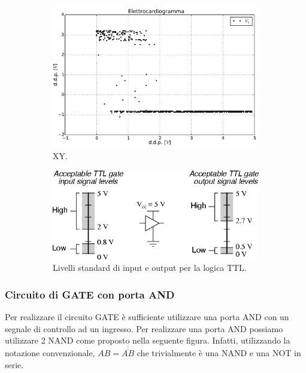 \begin{figure}[htpc]
\centering
	\begin{subfigure}[hc]{0.49\textwidth}
		\centering
		\includegraphics[width=.95\textwidth]{../E09/latex/XYschifo.pdf}
                \caption{XY.}
                \label{fig9:XY}
        \end{subfigure}%
	\quad
        \begin{subfigure}[hc]{0.49\textwidth}
		\centering
		\includegraphics[width=.95\textwidth]{../E09/latex/TTL.png}
                \caption{Livelli standard di input e output per la logica TTL.}
                \label{fig9:TTL}
        \end{subfigure}
\caption{}
\end{figure}
\vspace{-5mm}

\subsubsection{Circuito di GATE con porta AND}
Per realizzare il circuito GATE è sufficiente utilizzare una porta AND con un segnale di controllo ad un ingresso.
Per realizzare una porta AND possiamo utilizzare 2 NAND come proposto nella seguente figura.
Infatti, utilizzando la notazione convenzionale, $AB=\overline {\overline {AB}}$ che trivialmente è una NAND e una NOT in serie.
 

